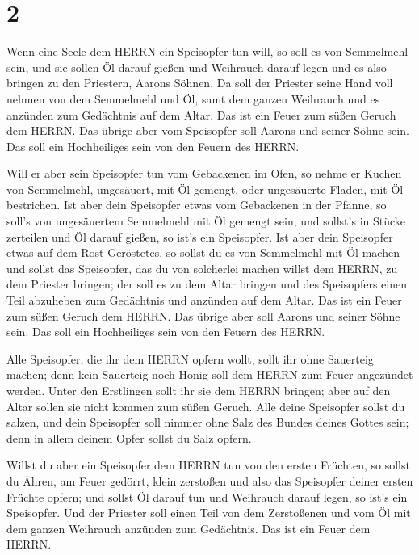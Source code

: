 \hypertarget{section-1}{%
\section{2}\label{section-1}}

 Wenn eine Seele dem HERRN ein Speisopfer tun will, so soll
es von Semmelmehl sein, und sie sollen Öl darauf gießen und Weihrauch
darauf legen  und es also bringen zu den Priestern, Aarons
Söhnen. Da soll der Priester seine Hand voll nehmen von dem Semmelmehl
und Öl, samt dem ganzen Weihrauch und es anzünden zum Gedächtnis auf dem
Altar. Das ist ein Feuer zum süßen Geruch dem HERRN.  Das
übrige aber vom Speisopfer soll Aarons und seiner Söhne sein. Das soll
ein Hochheiliges sein von den Feuern des HERRN.

 Will er aber sein Speisopfer tun vom Gebackenen im Ofen, so
nehme er Kuchen von Semmelmehl, ungesäuert, mit Öl gemengt, oder
ungesäuerte Fladen, mit Öl bestrichen.  Ist aber dein
Speisopfer etwas vom Gebackenen in der Pfanne, so soll's von
ungesäuertem Semmelmehl mit Öl gemengt sein;  und sollst's
in Stücke zerteilen und Öl darauf gießen, so ist's ein Speisopfer.
 Ist aber dein Speisopfer etwas auf dem Rost Geröstetes, so
sollst du es von Semmelmehl mit Öl machen  und sollst das
Speisopfer, das du von solcherlei machen willst dem HERRN, zu dem
Priester bringen; der soll es zu dem Altar bringen  und des
Speisopfers einen Teil abzuheben zum Gedächtnis und anzünden auf dem
Altar. Das ist ein Feuer zum süßen Geruch dem HERRN.  Das
übrige aber soll Aarons und seiner Söhne sein. Das soll ein Hochheiliges
sein von den Feuern des HERRN.

 Alle Speisopfer, die ihr dem HERRN opfern wollt, sollt ihr
ohne Sauerteig machen; denn kein Sauerteig noch Honig soll dem HERRN zum
Feuer angezündet werden.  Unter den Erstlingen sollt ihr
sie dem HERRN bringen; aber auf den Altar sollen sie nicht kommen zum
süßen Geruch.  Alle deine Speisopfer sollst du salzen, und
dein Speisopfer soll nimmer ohne Salz des Bundes deines Gottes sein;
denn in allem deinem Opfer sollst du Salz opfern.

 Willst du aber ein Speisopfer dem HERRN tun von den ersten
Früchten, so sollst du Ähren, am Feuer gedörrt, klein zerstoßen und also
das Speisopfer deiner ersten Früchte opfern;  und sollst Öl
darauf tun und Weihrauch darauf legen, so ist's ein Speisopfer.
 Und der Priester soll einen Teil von dem Zerstoßenen und
vom Öl mit dem ganzen Weihrauch anzünden zum Gedächtnis. Das ist ein
Feuer dem HERRN.

